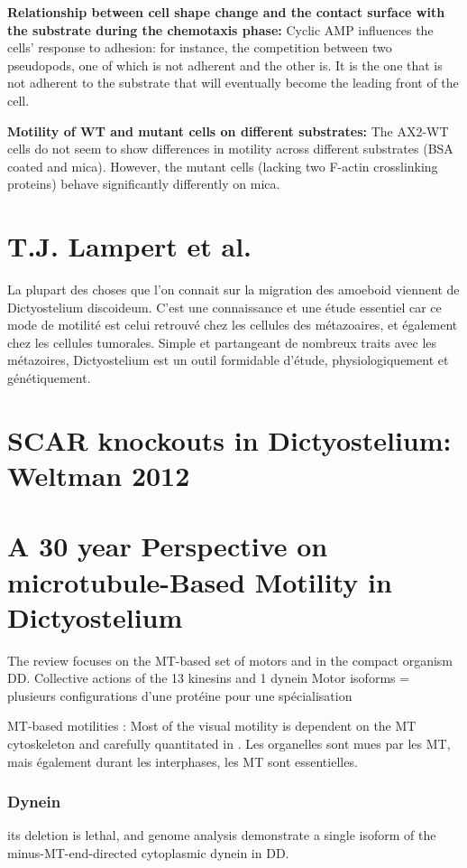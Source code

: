 \documentclass[twocolumn,10pt]{article} %
\begin{document}
\textbf{Relationship between cell shape change and the contact surface with the substrate during the chemotaxis phase:}
Cyclic AMP influences the cells' response to adhesion: for instance, the competition between two pseudopods, one of which is not adherent and the other is. It is the one that is not adherent to the substrate that will eventually become the leading front of the cell.

\textbf{Motility of WT and mutant cells on different substrates:}
The AX2-WT cells do not seem to show differences in motility across different substrates (BSA coated and mica).
However, the mutant cells (lacking two F-actin crosslinking proteins) behave significantly differently on mica.

\section{T.J. Lampert et al.}
\cite{Weber_2017}
La plupart des choses que l'on connait sur la migration des amoeboid viennent de Dictyostelium discoideum. C'est une connaissance et une étude essentiel car ce mode de motilité est celui retrouvé chez les cellules des métazoaires, et également chez les cellules tumorales. 
Simple et partangeant de nombreux traits avec les métazoires, Dictyostelium est un outil formidable d'étude, physiologiquement et génétiquement. 


\section{SCAR knockouts in Dictyostelium: Weltman 2012}
\cite{Veltman_2012}

\section{A 30 year Perspective on microtubule-Based Motility in Dictyostelium }
\cite{Koonce_2020}
The review focuses on the MT-based set of motors and in the compact organism DD. 
Collective actions of the 13 kinesins and 1 dynein 
Motor isoforms = plusieurs configurations d’une protéine pour une spécialisation

MT-based motilities : Most of the visual motility is dependent on the MT cytoskeleton and carefully quantitated in
 \cite{Roos_1987}. Les organelles sont mues par les MT, mais également durant les interphases, les MT sont essentielles. 

 \subsubsection*{Dynein}
its deletion is lethal, and genome analysis demonstrate a single isoform of the minus-MT-end-directed cytoplasmic dynein in DD. 
\end{document}
